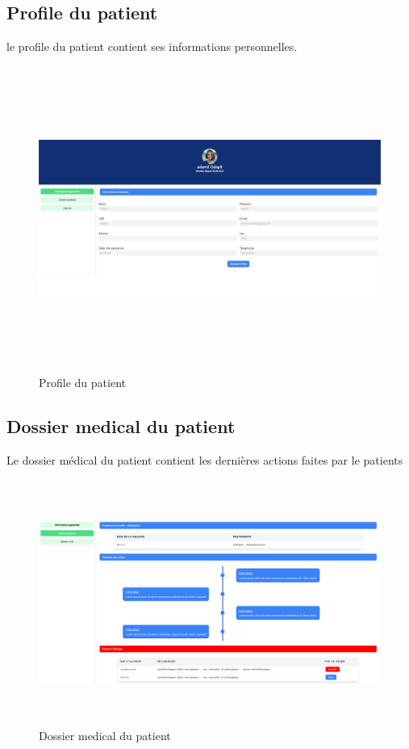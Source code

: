\subsection{Profile du patient}

le profile du patient contient ses informations personnelles.

\newpage


\begin{figure}[!h]
\centering
\begin{center}
\includegraphics[height=10cm,width=18cm]{profile.jpeg}
\end{center}
\caption{Profile du patient}
\end{figure}


\subsection{Dossier medical du patient}

Le dossier médical du patient contient les dernières actions faites par le patients

\begin{figure}[!h]
\begin{center}
\includegraphics[height=8cm,width=18cm]{med.png}
\end{center}
\caption{Dossier medical du patient}
\end{figure}

